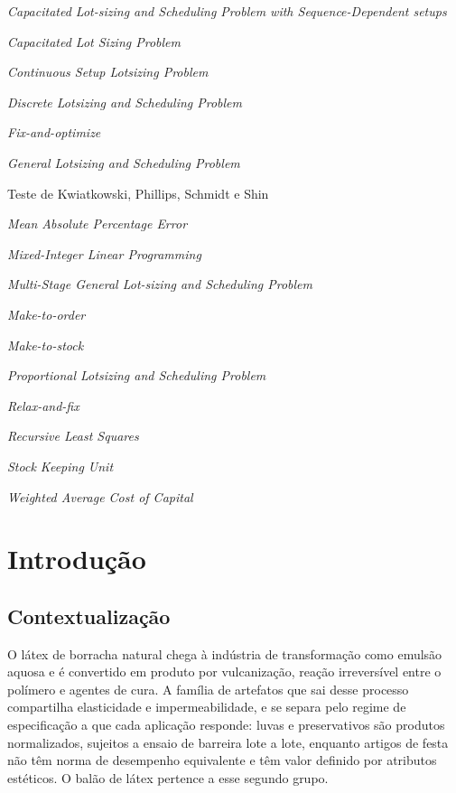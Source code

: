 \documentclass[
    12pt,
    openright,
    oneside,
    a4paper,
    fleqn,
    chapter=TITLE,
    section=TITLE,
    english,
    brazil
]{abntex2}
\begin{document}
\begin{siglas}
  \item[CLSD] \textit{Capacitated Lot-sizing and Scheduling Problem with Sequence-Dependent setups}
  \item[CLSP] \textit{Capacitated Lot Sizing Problem}
  \item[CSLP] \textit{Continuous Setup Lotsizing Problem}
  \item[DLSP] \textit{Discrete Lotsizing and Scheduling Problem}
  \item[FO] \textit{Fix-and-optimize}
  \item[GLSP] \textit{General Lotsizing and Scheduling Problem}
  \item[KPSS] Teste de Kwiatkowski, Phillips, Schmidt e Shin
  \item[MAPE] \textit{Mean Absolute Percentage Error}
  \item[MILP] \textit{Mixed-Integer Linear Programming}
  \item[MSGLSP] \textit{Multi-Stage General Lot-sizing and Scheduling Problem}
  \item[MTO] \textit{Make-to-order}
  \item[MTS] \textit{Make-to-stock}
  \item[PLSP] \textit{Proportional Lotsizing and Scheduling Problem}
  \item[RF] \textit{Relax-and-fix}
  \item[RLS] \textit{Recursive Least Squares}
  \item[SKU] \textit{Stock Keeping Unit}
  \item[WACC] \textit{Weighted Average Cost of Capital}
\end{siglas}

\tableofcontents*
\cleardoublepage

\textual

\chapter{Introdução}

\section{Contextualização}
\label{sec:contextualizacao}

O látex de borracha natural chega à indústria de transformação como emulsão aquosa e é convertido em produto por vulcanização, reação irreversível entre o polímero e agentes de cura. A família de artefatos que sai desse processo compartilha elasticidade e impermeabilidade, e se separa pelo regime de especificação a que cada aplicação responde: luvas e preservativos são produtos normalizados, sujeitos a ensaio de barreira lote a lote, enquanto artigos de festa não têm norma de desempenho equivalente e têm valor definido por atributos estéticos. O balão de látex pertence a esse segundo grupo.
\end{document}
